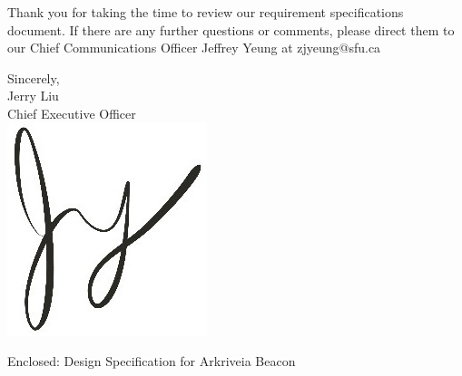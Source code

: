 \documentclass[11pt]{letter}
\begin{document}
\begin{letter}
\medskip
Thank you for taking the time to review our requirement specifications document. If there are any further questions or comments, please direct them to our Chief Communications Officer Jeffrey Yeung at zjyeung@sfu.ca
 
\medskip
Sincerely,\\
Jerry Liu\\
Chief Executive Officer\\

\vspace*{-0.25cm}
\includegraphics[scale=0.8]{./images/signature.jpg}

{Enclosed: Design Specification for Arkriveia Beacon}

\end{letter}
\end{document}
